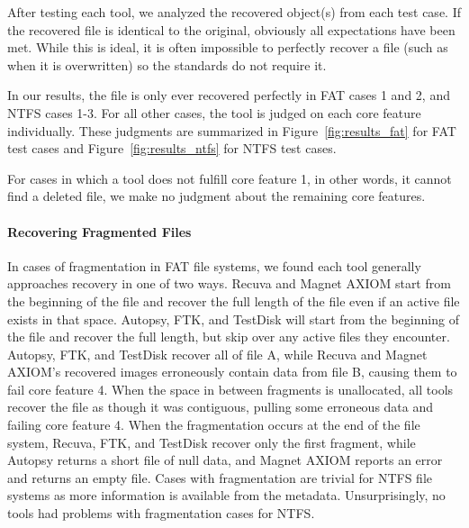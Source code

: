 \documentclass{ws-rv9x6}
\newenvironment{paraphrase}{\color{blue}}{\color{black}} %
\begin{document}
\begin{paraphrase}
%         

 After testing each tool, we analyzed the recovered object(s) from each test case. 
If the recovered file is identical to the original, obviously all expectations have been met. 
While this is ideal, it is often impossible to perfectly recover a file (such as when it is overwritten) so the standards do not require it. 

In our results, the file is only ever recovered perfectly in FAT cases 1 and 2, and NTFS cases 1-3. 
For all other cases, the tool is judged on each core feature individually. 
These judgments are summarized in Figure~\ref{fig:results_fat} for FAT test cases and Figure~\ref{fig:results_ntfs} for NTFS test cases.

For cases in which a tool does not fulfill core feature 1, in other words, it cannot find a deleted file, we make no judgment about the remaining core features.

\paragraph{Recovering Fragmented Files}
In cases of fragmentation in FAT file systems, we found each tool generally approaches recovery in one of two ways. 
Recuva and Magnet AXIOM start from the beginning of the file and recover the full length of the file even if an active file exists in that space. 
Autopsy, FTK, and TestDisk will start from the beginning of the file and recover the full length, but skip over any active files they encounter.
Autopsy, FTK, and TestDisk recover all of file A, while Recuva and Magnet AXIOM's recovered images erroneously contain data from file B, causing them to fail core feature 4. 
When the space in between fragments is unallocated, all tools recover the file as though it was contiguous, pulling some erroneous data and failing core feature 4. 
When the fragmentation occurs at the end of the file system, Recuva, FTK, and TestDisk recover only the first fragment, while Autopsy returns a short file of null data, and Magnet AXIOM reports an error and returns an empty file.
Cases with fragmentation are trivial for NTFS file systems as more information is available from the metadata. 
Unsurprisingly, no tools had problems with fragmentation cases for NTFS.


\end{paraphrase}
\end{document}
